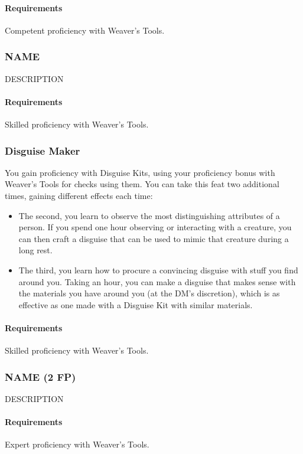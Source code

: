     \paragraph{Requirements} Competent proficiency with Weaver's Tools.
\subsubsection{NAME} \label{feat::name}
    DESCRIPTION
    \paragraph{Requirements} Skilled proficiency with Weaver's Tools.
\subsubsection{Disguise Maker} \label{feat::disguisemaker}
    You gain proficiency with Disguise Kits, using your proficiency bonus with Weaver's Tools for checks using them.
    You can take this feat two additional times, gaining different effects each time:
    \begin{itemize}
        \item The second, you learn to observe the most distinguishing attributes of a person.
        If you spend one hour observing or interacting with a creature, you can then craft a disguise that can be used to mimic that creature during a long rest.
        \item The third, you learn how to procure a convincing disguise with stuff you find around you.
        Taking an hour, you can make a disguise that makes sense with the materials you have around you (at the DM's discretion), which is as effective as one made with a Disguise Kit with similar materials.
    \end{itemize}
    \paragraph{Requirements} Skilled proficiency with Weaver's Tools.
\subsubsection{NAME (2 FP)} \label{feat::name}
    DESCRIPTION
    \paragraph{Requirements} Expert proficiency with Weaver's Tools.
